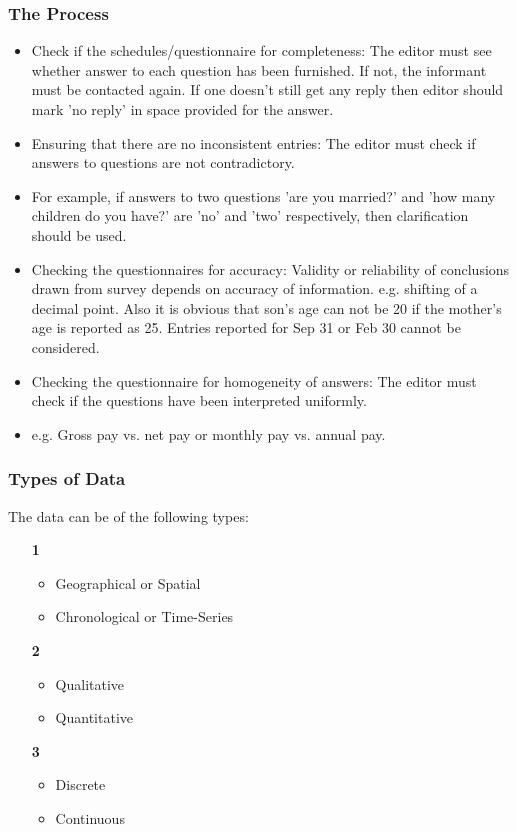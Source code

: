 \documentclass[
10pt, %
a4paper, %
]{report}
\begin{document}
\subsubsection*{The Process}
\begin{itemize}
\item Check if the schedules/questionnaire for completeness:
The editor must see whether answer to each question has been furnished. If not, the informant must be contacted again. If one doesn't still get any reply then editor should mark 'no reply' in space provided for the answer.
\item Ensuring that there are no inconsistent entries:
The editor must check if answers to questions are not contradictory.
\item For example, if answers to two questions 'are you married?' and 'how many children do you have?' are 'no' and 'two' respectively, then clarification should be used.
\item Checking the questionnaires for accuracy:
Validity or reliability of conclusions drawn from survey depends on
accuracy of information. e.g. shifting of a decimal point. Also it is obvious that son’s age can not be 20 if the mother’s age is reported as 25. Entries reported for Sep 31 or Feb 30 cannot be considered.
\item Checking the questionnaire for homogeneity of answers: The editor must check if the questions have been interpreted uniformly. \item e.g. Gross pay vs. net pay or monthly pay vs. annual pay.
\end{itemize}


\subsubsection*{Types of Data}
The data can be of the following types:
\begin{itemize}
\item[\textbf{1}]
\begin{itemize}
\item Geographical or Spatial
\item Chronological or Time-Series
\end{itemize}
\item[\textbf{2}]
\begin{itemize}
\item Qualitative
\item Quantitative
\end{itemize}
\item[\textbf{3}]
\begin{itemize}
\item Discrete
\item Continuous
\end{itemize}
\end{itemize}
\end{document}
